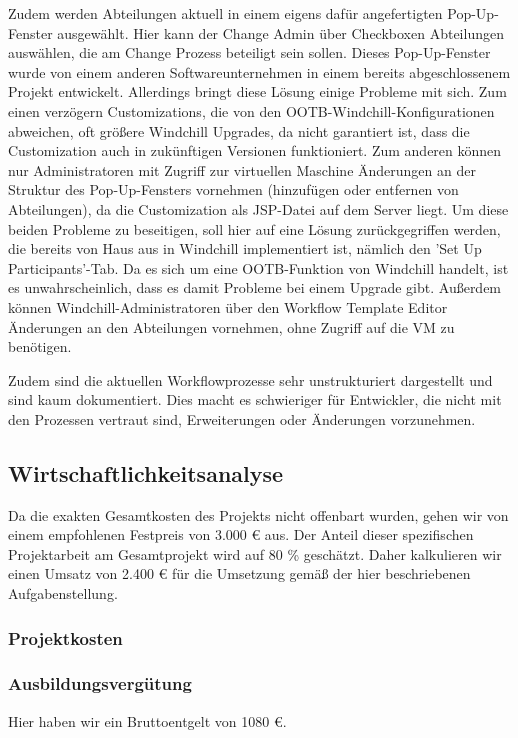 Zudem werden Abteilungen aktuell in einem eigens dafür angefertigten Pop-Up-Fenster ausgewählt.
Hier kann der Change Admin über Checkboxen Abteilungen auswählen, die am Change Prozess beteiligt sein sollen.
Dieses Pop-Up-Fenster wurde von einem anderen Softwareunternehmen in einem bereits abgeschlossenem Projekt entwickelt.
Allerdings bringt diese Lösung einige Probleme mit sich.
Zum einen verzögern Customizations, die von den OOTB-Windchill-Konfigurationen abweichen, oft größere Windchill Upgrades, da nicht garantiert ist, dass die Customization auch in zukünftigen Versionen funktioniert.
Zum anderen können nur Administratoren mit Zugriff zur virtuellen Maschine Änderungen an der Struktur des Pop-Up-Fensters vornehmen (\zB hinzufügen oder entfernen von Abteilungen), da die Customization als JSP-Datei auf dem Server liegt.
Um diese beiden Probleme zu beseitigen, soll hier auf eine Lösung zurückgegriffen werden, die bereits von Haus aus in Windchill implementiert ist, nämlich den 'Set Up Participants'-Tab.
Da es sich um eine OOTB-Funktion von Windchill handelt, ist es unwahrscheinlich, dass es damit Probleme bei einem Upgrade gibt.
Außerdem können Windchill-Administratoren über den Workflow Template Editor Änderungen an den Abteilungen vornehmen, ohne Zugriff auf die VM zu benötigen.

Zudem sind die aktuellen Workflowprozesse sehr unstrukturiert dargestellt und sind kaum dokumentiert.
Dies macht es schwieriger für Entwickler, die nicht mit den Prozessen vertraut sind, Erweiterungen oder Änderungen vorzunehmen.
\subsection{Wirtschaftlichkeitsanalyse}
\label{sec:Wirtschaftlichkeitsanalyse}

Da die exakten Gesamtkosten des Projekts nicht offenbart wurden, gehen wir von einem empfohlenen Festpreis von 3.000 € aus.
Der Anteil dieser spezifischen Projektarbeit am Gesamtprojekt wird auf 80 \% geschätzt.
Daher kalkulieren wir einen Umsatz von 2.400 € für die Umsetzung gemäß der hier beschriebenen Aufgabenstellung.

\subsubsection{Projektkosten}
\subsubsection*{Ausbildungsvergütung}
Hier haben wir ein Bruttoentgelt von 1080 €.


